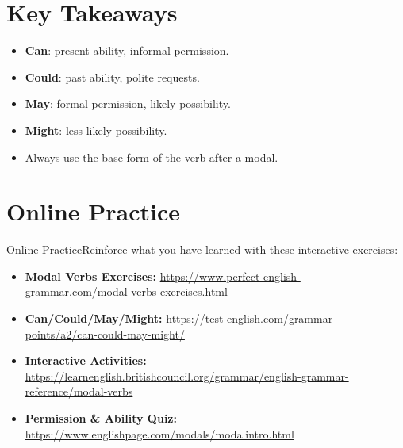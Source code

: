 \section{Key Takeaways}
\begin{itemize}
    \item \textbf{Can}: present ability, informal permission.
    \item \textbf{Could}: past ability, polite requests.
    \item \textbf{May}: formal permission, likely possibility.
    \item \textbf{Might}: less likely possibility.
    \item Always use the base form of the verb after a modal.
\end{itemize}

\section{Online Practice}
\begin{tcolorbox}[colback=blue!5,colframe=blue!40!black,title=Resources to Practice]
Online PracticeReinforce what you have learned with these interactive exercises:
\begin{itemize}
    \item \textbf{Modal Verbs Exercises:} \url{https://www.perfect-english-grammar.com/modal-verbs-exercises.html}
    \item \textbf{Can/Could/May/Might:} \url{https://test-english.com/grammar-points/a2/can-could-may-might/}
    \item \textbf{Interactive Activities:} \url{https://learnenglish.britishcouncil.org/grammar/english-grammar-reference/modal-verbs}
    \item \textbf{Permission \& Ability Quiz:} \url{https://www.englishpage.com/modals/modalintro.html}
\end{itemize}
\end{tcolorbox}




